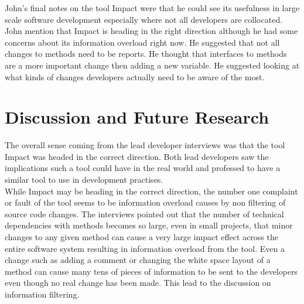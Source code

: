 \documentclass[conference]{IEEEtran}
\begin{document}
John's final notes on the tool Impact were that he could see its usefulness in large scale software
development especially where not all developers are collocated. John mention that Impact is
heading in the right direction although he had some concerns about its information overload
right now. He suggested that not all changes to methods need to be reports. He thought that
interfaces to methods are a more important change then adding a new variable. He suggested
looking at what kinds of changes developers actually need to be aware of the most.\\


\section{Discussion and Future Research}
The overall sense coming from the lead developer interviews was that the tool Impact was 
headed in the correct direction. Both lead developers saw the implications such a tool
could have in the real world and professed to have a similar tool to use in development
practises.\\

While Impact may be heading in the correct direction, the number one complaint or fault
of the tool seems to be information overload causes by non filtering of source code changes.
The interviews pointed out that the number of technical dependencies with methods
becomes so large, even in small projects, that minor changes to any given method can cause
a very large impact effect across the entire software system resulting in information
overload from the tool. Even a change such as adding a comment or changing the 
white space layout of a method can cause many tens of pieces of information to be sent
to the developers even though no real change has been made. This lead to the discussion
on information filtering.\\
\end{document}
